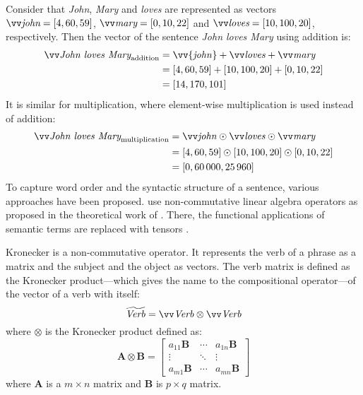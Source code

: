 Consider that \textit{John}, \textit{Mary} and \textit{loves} are represented as vectors $\ov{\text{\it john}} = [4, 60, 59]$, $\ov{\text{\it mary}} = [0, 10, 22]$ and $\ov{\text{\it loves}} = [10, 100, 20]$, respectively. Then the vector of the sentence \textit{John loves Mary} using addition is:
%
\begin{align*}
  \ov{\text{\it John loves Mary}}_{\text{addition}} &= \vv{\mathit{john}} + \ov{\mathit{loves}} + \ov{\mathit{mary}} \\
                                  &= [4, 60, 59] + [10, 100, 20] + [0, 10, 22] \\
                                  &= [14, 170, 101]
\end{align*}
%
It is similar for multiplication, where element-wise multiplication is used instead of addition:
%
\begin{align*}
  \ov{\text{\it John loves Mary}}_{\text{multiplication}} &= \ov{\mathit{john}} \odot \ov{\mathit{loves}} \odot \ov{\mathit{mary}} \\
                                  &= [4, 60, 59] \odot [10, 100, 20] \odot [0, 10, 22] \\
                                  &= [0, 60\,000, 25\,960]
\end{align*}
%
To capture word order and the syntactic structure of a sentence, various approaches have been proposed.  use non-commutative linear algebra operators as proposed in the theoretical work of . There, the functional applications of semantic terms are replaced with tensors \cite{Bourbaki1998commutative}.

Kronecker \cite{Grefenstette:2011:ETV:2140490.2140497} is a non-commutative operator. It represents the verb of a phrase as a matrix and the subject and the object as vectors. The verb matrix is defined as the Kronecker product---which gives the name to the compositional operator---of the vector of a verb with itself:
%
\begin{equation}
  \widetilde{\mathit{Verb}} = \ov{\mathit{Verb}} \otimes \ov{\mathit{Verb}}
\end{equation}
%
where $\otimes$ is the Kronecker product defined as:
\begin{equation}
  \label{eq:kron-def}
 \mathbf{A}\otimes\mathbf{B} = \begin{bmatrix} a_{11} \mathbf{B} & \cdots & a_{1n}\mathbf{B} \\ \vdots & \ddots & \vdots \\ a_{m1} \mathbf{B} & \cdots & a_{mn} \mathbf{B} \end{bmatrix} 
\end{equation}
where $\mathbf{A}$ is a $m \times n$ matrix and $\mathbf{B}$ is $p \times q$ matrix.

